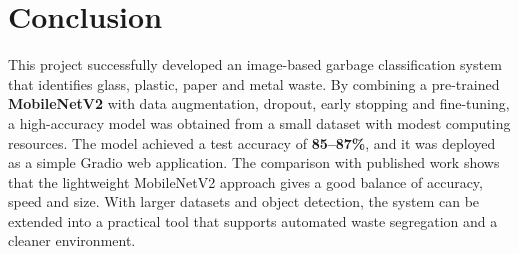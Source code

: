 \section{Conclusion}
This project successfully developed an image-based garbage classification system that identifies glass, plastic, paper and metal waste. By combining a pre-trained \textbf{MobileNetV2} with data augmentation, dropout, early stopping and fine-tuning, a high-accuracy model was obtained from a small dataset with modest computing resources. The model achieved a test accuracy of \textbf{85--87\%}, and it was deployed as a simple Gradio web application. The comparison with published work shows that the lightweight MobileNetV2 approach gives a good balance of accuracy, speed and size. With larger datasets and object detection, the system can be extended into a practical tool that supports automated waste segregation and a cleaner environment.
